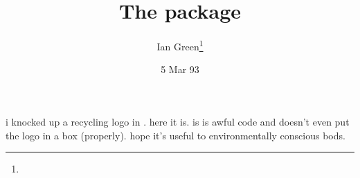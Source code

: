\documentclass[pagesize=auto, fontsize=14pt, DIV=9, parskip=half]{scrartcl}
\title{The \pkg{recycle} package}
\author{Ian Green\thanks{\mail{img@aisb.ed.ac.uk}}}
\date{5 Mar 93}
\begin{document}
\maketitle

i knocked up a recycling logo in \MF\@. here it is.  is is awful
code and doesn't even put the logo in a box (properly).  hope it's
useful to environmentally conscious bods.  
\end{document}

